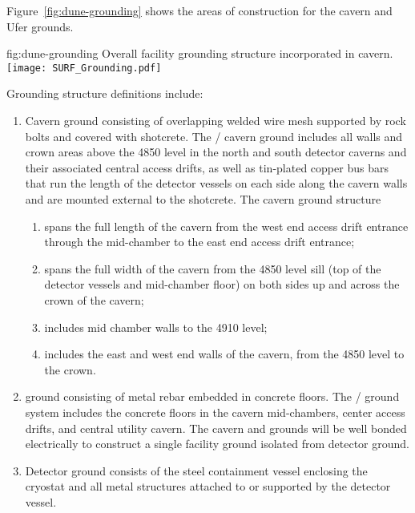 Figure~\ref{fig:dune-grounding} shows the areas of construction for
the cavern and Ufer grounds.
\begin{dunefigure}{fig:dune-grounding}
  {Overall  facility grounding structure incorporated in cavern.}
  \texttt{[image: SURF\_Grounding.pdf]}
\end{dunefigure}
Grounding structure definitions include:
\begin{enumerate}
 \item Cavern ground consisting of overlapping welded wire mesh
   supported by rock bolts and covered with shotcrete. The
   / cavern ground includes all walls and
   crown areas above the 4850 level in the north and south detector
   caverns and their associated central access drifts, as well as tin-plated
   copper bus bars that run the length of the detector vessels
   on each side along the cavern walls and are mounted external to the
   shotcrete.  The cavern ground structure
\begin{enumerate}
 \item spans the full length of the cavern from the west end access
   drift entrance through the mid-chamber to the east end access drift
   entrance;
 \item spans the full width of the cavern from the 4850 level sill
   (top of the detector vessels and mid-chamber floor) on both sides
   up and across the crown of the cavern;
 \item includes mid chamber walls to the 4910 level;
 \item includes the east and west end walls of the cavern, from the
   4850 level to the crown.
\end{enumerate}
 \item {} ground consisting of metal rebar embedded in
   concrete floors. The /  ground
   system includes the concrete floors in the cavern mid-chambers,
   center access drifts, and central utility cavern. The cavern and
    grounds will be well bonded electrically to construct
   a single facility ground isolated from detector ground.
 \item Detector ground consists of the steel containment vessel
   enclosing the cryostat and all metal structures attached to or
   supported by the detector vessel.
\end{enumerate}


